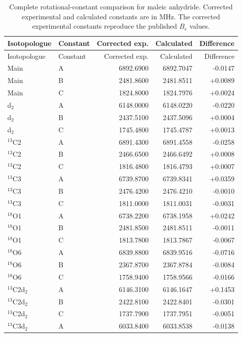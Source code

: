 \documentclass[12pt]{article}
\begin{document}
\begin{longtable}{llrrr}
\caption{Complete rotational-constant comparison for maleic anhydride.
Corrected experimental and calculated constants are in MHz. The corrected
experimental constants reproduce the published $B_e$ values.}
\label{tab:si-maleic-rotconstants}\\
\toprule
Isotopologue & Constant & Corrected exp. & Calculated & Difference \\
\midrule
\endfirsthead
\toprule
Isotopologue & Constant & Corrected exp. & Calculated & Difference \\
\midrule
\endhead
Main & A & 6892.6900 & 6892.7047 & -0.0147 \\
Main & B & 2481.8600 & 2481.8511 & +0.0089 \\
Main & C & 1824.8000 & 1824.7976 & +0.0024 \\
d$_2$ & A & 6148.0000 & 6148.0220 & -0.0220 \\
d$_2$ & B & 2437.5100 & 2437.5096 & +0.0004 \\
d$_2$ & C & 1745.4800 & 1745.4787 & +0.0013 \\
$^{13}$C2 & A & 6891.4300 & 6891.4558 & -0.0258 \\
$^{13}$C2 & B & 2466.6500 & 2466.6492 & +0.0008 \\
$^{13}$C2 & C & 1816.4800 & 1816.4793 & +0.0007 \\
$^{13}$C3 & A & 6739.8700 & 6739.8341 & +0.0359 \\
$^{13}$C3 & B & 2476.4200 & 2476.4210 & -0.0010 \\
$^{13}$C3 & C & 1811.0000 & 1811.0031 & -0.0031 \\
$^{18}$O1 & A & 6738.2200 & 6738.1958 & +0.0242 \\
$^{18}$O1 & B & 2481.8500 & 2481.8511 & -0.0011 \\
$^{18}$O1 & C & 1813.7800 & 1813.7867 & -0.0067 \\
$^{18}$O6 & A & 6839.8800 & 6839.9516 & -0.0716 \\
$^{18}$O6 & B & 2367.8700 & 2367.8784 & -0.0084 \\
$^{18}$O6 & C & 1758.9400 & 1758.9566 & -0.0166 \\
$^{13}$C2d$_2$ & A & 6146.3100 & 6146.1647 & +0.1453 \\
$^{13}$C2d$_2$ & B & 2422.8100 & 2422.8401 & -0.0301 \\
$^{13}$C2d$_2$ & C & 1737.7900 & 1737.7951 & -0.0051 \\
$^{13}$C3d$_2$ & A & 6033.8400 & 6033.8538 & -0.0138 \\

\end{longtable}
\end{document}
